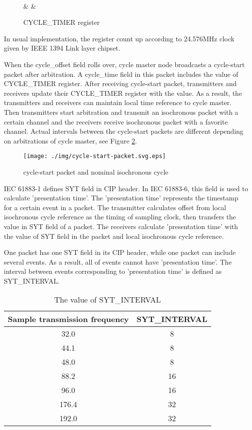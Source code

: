 \documentclass[onecolumn]{article}
\begin{document}
\begin{figure}[htbp]
\centering
\begin{bytefield}[bitwidth=auto,endianness=big]{32}
	 \\
	 &
	 &
\end{bytefield}
\caption{{CYCLE\_TIMER register}}
\label{cycle_timer}
\end{figure}

In usual implementation, the register count up according to 24.576MHz clock given by IEEE 1394 Link layer chipset.

When the cycle\_offset field rolls over, cycle master node broadcasts a cycle-start packet after arbitration. A cycle\_time field in this packet includes the value of CYCLE\_TIMER register. After receiving cycle-start packet, transmitters and receivers update their CYCLE\_TIMER register with the value. As a result, the transmitters and receivers can maintain local time reference to cycle master. Then transmitters start arbitration and transmit an isochronous packet with a certain channel and the receivers receive isochronous packet with a favorite channel. Actual intervals between the cycle-start packets are different depending on arbitrations of cycle master, see Figure \ref{cycle-start}.

\begin{figure}[htbp]
\centering
\texttt{[image: ./img/cycle-start-packet.svg.eps]}
\caption{{cycle-start packet and nominal isochronous cycle}}
\label{cycle-start}
\end{figure}

IEC 61883-1 defines SYT field in CIP header. In IEC 61883-6, this field is used to calculate 'presentation time'. The 'presentation time' represents the timestamp for a certain event in a packet. The transmitter calculates offset from local isochronous cycle reference as the timing of sampling clock, then transfers the value in SYT field of a packet. The receivers calculate 'presentation time' with the value of SYT field in the packet and local isochronous cycle reference.

One packet has one SYT field in its CIP header, while one packet can include several events. As a result, all of events cannot have 'presentation time'. The interval between events corresponding to 'presentation time' is defined as SYT\_INTERVAL.

\begin{table}[ht]
	\centering
	\caption{{The value of SYT\_INTERVAL}}
	\label{syt_interval}
	\begin{tabular}{cc} \toprule
		Sample transmission frequency & SYT\_INTERVAL \\ \midrule
		32.0	& 8	\\
		44.1	& 8	\\
		48.0	& 8	\\
		88.2	& 16	\\
		96.0	& 16	\\
		176.4	& 32	\\
		192.0	& 32	\\ \bottomrule
	\end{tabular}
\end{table}
\end{document}
